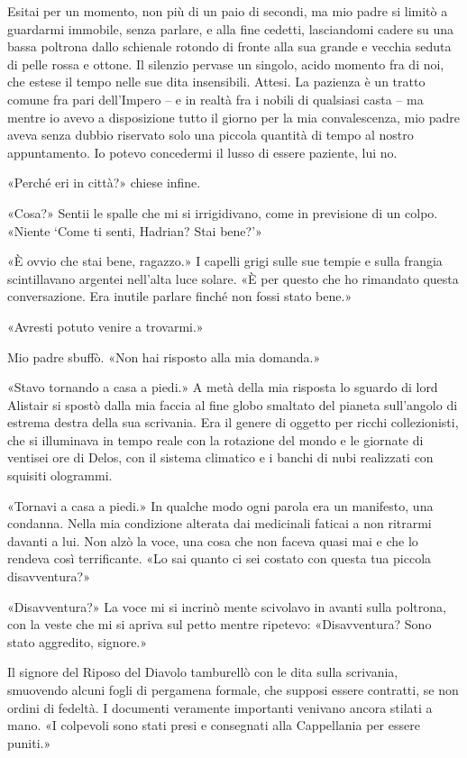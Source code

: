 Esitai per un momento, non più di un paio di secondi, ma mio padre si
limitò a guardarmi immobile, senza parlare, e alla fine cedetti,
lasciandomi cadere su una bassa poltrona dallo schienale rotondo di
fronte alla sua grande e vecchia seduta di pelle rossa e ottone. Il
silenzio pervase un singolo, acido momento fra di noi, che estese il
tempo nelle sue dita insensibili. Attesi. La pazienza è un tratto comune
fra pari dell'Impero -- e in realtà fra i nobili di qualsiasi casta --
ma mentre io avevo a disposizione tutto il giorno per la mia
convalescenza, mio padre aveva senza dubbio riservato solo una piccola
quantità di tempo al nostro appuntamento. Io potevo concedermi il lusso
di essere paziente, lui no.

«Perché eri in città?» chiese infine.

«Cosa?» Sentii le spalle che mi si irrigidivano, come in previsione di
un colpo. «Niente `Come ti senti, Hadrian? Stai bene?'»

«È ovvio che stai bene, ragazzo.» I capelli grigi sulle sue tempie e
sulla frangia scintillavano argentei nell'alta luce solare. «È per
questo che ho rimandato questa conversazione. Era inutile parlare finché
non fossi stato bene.»

«Avresti potuto venire a trovarmi.»

Mio padre sbuffò. «Non hai risposto alla mia domanda.»

«Stavo tornando a casa a piedi.» A metà della mia risposta lo sguardo di
lord Alistair si spostò dalla mia faccia al fine globo smaltato del
pianeta sull'angolo di estrema destra della sua scrivania. Era il genere
di oggetto per ricchi collezionisti, che si illuminava in tempo reale
con la rotazione del mondo e le giornate di ventisei ore di Delos, con
il sistema climatico e i banchi di nubi realizzati con squisiti
ologrammi.

«Tornavi a casa a piedi.» In qualche modo ogni parola era un manifesto,
una condanna. Nella mia condizione alterata dai medicinali faticai a non
ritrarmi davanti a lui. Non alzò la voce, una cosa che non faceva quasi
mai e che lo rendeva così terrificante. «Lo sai quanto ci sei costato
con questa tua piccola disavventura?»

«Disavventura?» La voce mi si incrinò mente scivolavo in avanti sulla
poltrona, con la veste che mi si apriva sul petto mentre ripetevo:
«Disavventura? Sono stato aggredito, signore.»

Il signore del Riposo del Diavolo tamburellò con le dita sulla
scrivania, smuovendo alcuni fogli di pergamena formale, che supposi
essere contratti, se non ordini di fedeltà. I documenti veramente
importanti venivano ancora stilati a mano. «I colpevoli sono stati presi
e consegnati alla Cappellania per essere puniti.»

